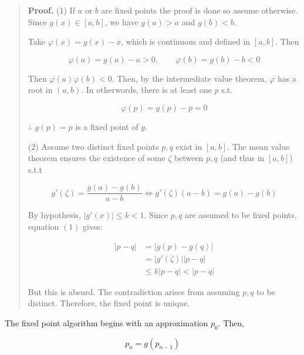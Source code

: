 \documentclass[12pt]{article}
\theoremstyle{definition}
\begin{document}
\small
\begin{quote}

\textbf{Proof.} (1) If $a$ or $b$ are fixed points the proof is done so assume
otherwise. Since $g(x) \in [a, b]$,  we have $g(a) > a$ and $g(b) < b$.


Take $\varphi(x) = g(x) - x$, which is continuous and defined in $[a,
b]$. Then 

\begin{equation*}
    \varphi(a) = g(a) - a > 0, \qquad \varphi(b) = g(b) - b < 0
\end{equation*}

Then $\varphi(a)\varphi(b) < 0$. Then, by the intermediate value theorem,
$\varphi$ has a root in $(a, b)$. In otherwords, there is at least one $p$ s.t. 

\begin{equation*}
    \varphi(p) = g(p) - p = 0
\end{equation*}

$\therefore $ $g(p) = p$ is a fixed point of $g$.

(2) Assume two distinct fixed points $p, q$ exist in $[a, b]$. The mean value
theorem ensures the existence of some $\zeta$ between $p, q$ (and thus in $[a,
b]$) s.t.t 

\begin{equation}
    g'(\zeta) = \frac{g(a) - g(b)}{a - b} \iff g'(\zeta)(a-b) = g(a) - g(b)
\end{equation}

By hypothesis, $\left| g'(x) \right| \leq k < 1$. Since $p, q$ are assumed to
be fixed points, equation $(1)$ gives: 

\begin{align*}
    \left| p - q \right| 
    &= \left| g(p) - g(q) \right| \\ 
    &= \left| g'(\zeta) \right| \left| p - q \right|  \\ 
    &\leq k \left| p-q \right|  < \left| p - q \right| 
\end{align*}

But this is absurd. The contradiction arises from assuming $p, q$ to be
distinct. Therefore, the fixed point is unique.


\end{quote}
\normalsize

The fixed point algorithm begins with an approximation $p_0$. Then, 

\begin{equation*}
    p_n = g(p_{n-1})
\end{equation*}
\end{document}
